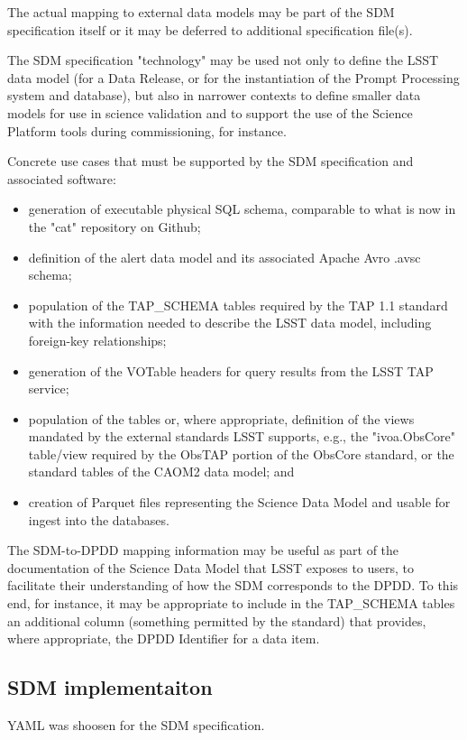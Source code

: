 The actual mapping to external data models may be part of the SDM specification itself or it may be deferred to additional specification file(s).

The SDM specification "technology" may be used not only to define the LSST data model (for a Data Release, or for the instantiation of the Prompt Processing system and database), but also in narrower contexts to define smaller data models for use in science validation and to support the use of the Science Platform tools during commissioning, for instance.

Concrete use cases that must be supported by the SDM specification and associated software:

\begin{itemize}
\item     generation of executable physical SQL schema, comparable to what is now in the "cat" repository on Github;
\item     definition of the alert data model and its associated Apache Avro .avsc schema;
\item     population of the TAP\_SCHEMA tables required by the TAP 1.1 standard with the information needed to describe the LSST data model, including foreign-key relationships;
\item     generation of the VOTable headers for query results from the LSST TAP service;
\item     population of the tables or, where appropriate, definition of the views mandated by the external standards LSST supports, e.g., the "ivoa.ObsCore" table/view required by the ObsTAP portion of the ObsCore standard, or the standard tables of the CAOM2 data model; and
\item     creation of Parquet files representing the Science Data Model and usable for ingest into the databases.
\end{itemize}

The SDM-to-DPDD mapping information may be useful as part of the documentation of the Science Data Model that LSST exposes to users, to facilitate their understanding of how the SDM corresponds to the DPDD.  To this end, for instance, it may be appropriate to include in the TAP\_SCHEMA tables an additional column (something permitted by the standard) that provides, where appropriate, the DPDD Identifier for a data item.


\subsection {SDM implementaiton}
YAML was shoosen for the SDM specification.
